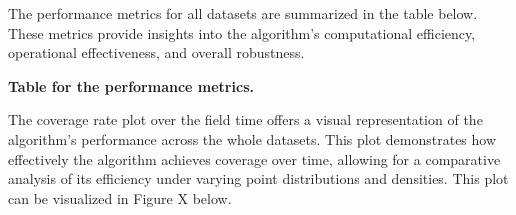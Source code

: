 

\vspace*{6mm}

The performance metrics for all datasets are summarized in the table below. These metrics provide insights into the algorithm's computational efficiency, operational effectiveness, and overall robustness.

\textbf{Table for the performance metrics.} 

\vspace*{6mm} 


The coverage rate plot over the field time offers a visual representation of the algorithm's performance across the whole datasets. This plot demonstrates how effectively the algorithm achieves coverage over time, allowing for a comparative analysis of its efficiency under varying point distributions and densities. This plot can be visualized in Figure X below.   



